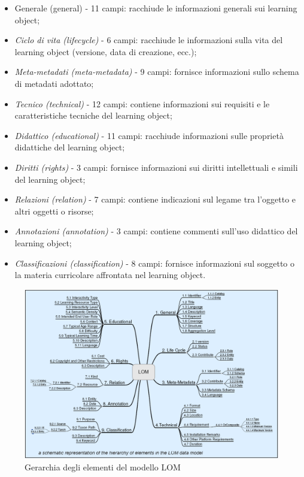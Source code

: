 \begin{itemize}
\item Generale (general) - 11 campi: racchiude le informazioni generali sui learning object;
\item \textit{Ciclo di vita (lifecycle)} - 6 campi: racchiude le informazioni sulla vita del learning object (versione, data di creazione, ecc.);
\item \textit{Meta-metadati (meta-metadata)} - 9 campi: fornisce informazioni sullo schema di metadati adottato;
\item \textit{Tecnico (technical)} - 12 campi: contiene informazioni sui requisiti e le caratteristiche tecniche del learning object;
\item \textit{Didattico (educational)} - 11 campi: racchiude informazioni sulle proprietà didattiche del learning object;
\item \textit{Diritti (rights)} - 3 campi: fornisce informazioni sui diritti intellettuali e simili del learning object;
\item \textit{Relazioni (relation)} - 7 campi: contiene indicazioni sul legame tra l'oggetto e altri oggetti o risorse;
\item \textit{Annotazioni (annotation)} - 3 campi: contiene commenti sull'uso didattico del learning object;
\item \textit{Classificazioni (classification)} - 8 campi: fornisce informazioni sul soggetto o la materia curricolare affrontata nel learning object.
\end{itemize}

\begin{figure}[H]
\centering
\includegraphics[scale=0.3]{res/LOM.png}
\caption{Gerarchia degli elementi del modello LOM}
\label{fig:lom}
\end{figure}

